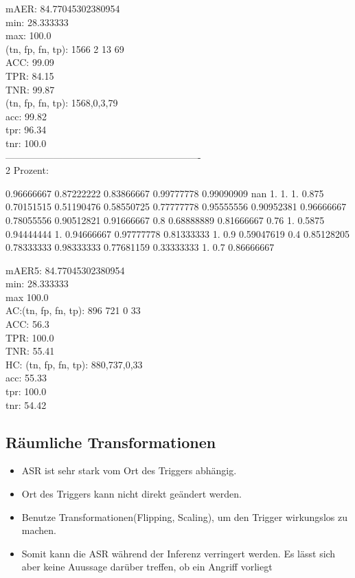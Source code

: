 \documentclass[11pt,a4paper]{article}
\numberwithin{equation}{section}
\begin{document}
	mAER:  84.77045302380954\\
	min:  28.333333\\
	max:  100.0\\
	
	(tn, fp, fn, tp):  1566 2 13 69\\
	ACC: 99.09\\
	TPR:  84.15\\
	TNR:  99.87\\
	
	
	(tn, fp, fn, tp): 1568,0,3,79\\
	acc: 99.82\\
	tpr: 96.34\\
	tnr: 100.0\\
	-------------------------------------------------------------\\
	
	2 Prozent:
	
	0.96666667 0.87222222 0.83866667 0.99777778 0.99090909        nan
	1.         1.         1.         0.875      0.70151515 0.51190476
	0.58550725 0.77777778 0.95555556 0.90952381 0.96666667 0.78055556
	0.90512821 0.91666667 0.8        0.68888889 0.81666667 0.76
	1.         0.5875     0.94444444 1.         0.94666667 0.97777778
	0.81333333 1.         0.9        0.59047619 0.4        0.85128205
	0.78333333 0.98333333 0.77681159 0.33333333 1.         0.7
	0.86666667
	
	mAER5:  84.77045302380954\\
	min:  28.333333\\
	max  100.0\\
	
	AC:(tn, fp, fn, tp):  896 721 0 33\\
	ACC: 56.3\\
	TPR:  100.0\\
	TNR:  55.41\\
	
	HC: (tn, fp, fn, tp): 880,737,0,33\\
	acc: 55.33\\
	tpr: 100.0\\
	tnr: 54.42\\
	
	
	
	       
	\subsection{Räumliche Transformationen}
	\begin{itemize}
		\item ASR ist sehr stark vom Ort des Triggers abhängig.
		\item Ort des Triggers kann nicht direkt geändert werden.
		\item Benutze Transformationen(Flipping, Scaling), um den Trigger wirkungslos zu machen.
		\item Somit kann die ASR während der Inferenz verringert werden. Es lässt sich aber keine Auussage darüber treffen, ob ein Angriff vorliegt
	\end{itemize}
	\newpage
\end{document}
